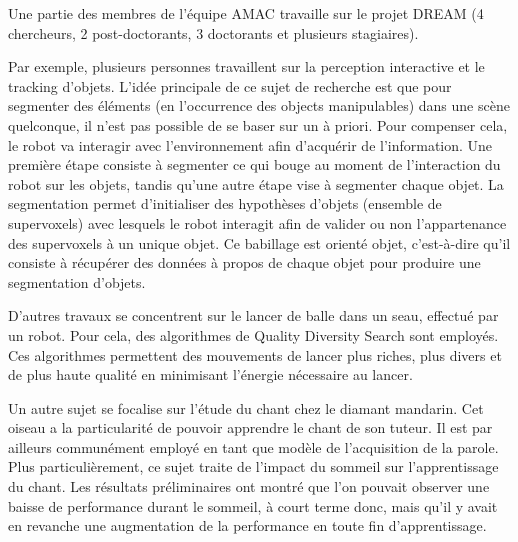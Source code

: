 \documentclass[draft]{llncs}
\begin{document}
Une partie des membres de l'équipe AMAC travaille sur le projet DREAM (4 chercheurs, 2 post-doctorants, 3 doctorants et plusieurs stagiaires).

Par exemple, plusieurs personnes travaillent sur la perception interactive et le tracking d'objets.
L'idée principale de ce sujet de recherche est que pour segmenter des éléments (en l'occurrence des objects manipulables) dans une scène quelconque, il n'est pas possible de se baser sur un à priori.
Pour compenser cela, le robot va interagir avec l'environnement afin d'acquérir de l'information.
Une première étape consiste à segmenter ce qui bouge au moment de l'interaction du robot sur les objets, tandis qu'une autre étape vise à segmenter chaque objet.
La segmentation permet d'initialiser des hypothèses d'objets (ensemble de supervoxels) avec lesquels le robot interagit afin de valider ou non l'appartenance des supervoxels à un unique objet.
Ce babillage est orienté objet, c'est-à-dire qu'il consiste à récupérer des données à propos de chaque objet pour produire une segmentation d'objets.



D'autres travaux se concentrent sur le lancer de balle dans un seau, effectué par un robot.
Pour cela, des algorithmes de Quality Diversity Search sont employés.
Ces algorithmes permettent des mouvements de lancer plus riches, plus divers et de plus haute qualité en minimisant l'énergie nécessaire au lancer.

Un autre sujet se focalise sur l'étude du chant chez le diamant mandarin.
Cet oiseau a la particularité de pouvoir apprendre le chant de son tuteur.
Il est par ailleurs communément employé en tant que modèle de l'acquisition de la parole.
Plus particulièrement, ce sujet traite de l'impact du sommeil sur l'apprentissage du chant.
Les résultats préliminaires ont montré que l'on pouvait observer une baisse de performance durant le sommeil, à court terme donc, mais qu'il y avait en revanche une  augmentation de la performance en toute fin d'apprentissage.
\end{document}
